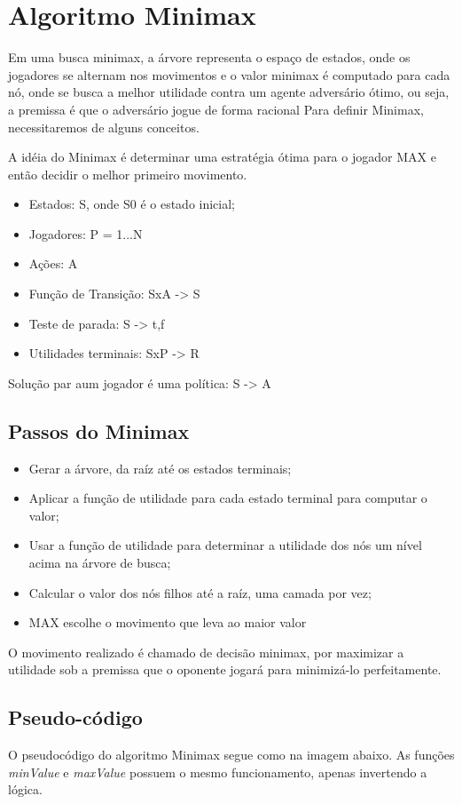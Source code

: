 \documentclass[sigplan,screen]{acmart}
\begin{document}
\section{Algoritmo Minimax}
Em uma busca minimax, a árvore representa o espaço de estados, onde os jogadores se alternam nos movimentos e o valor minimax é computado para cada nó, onde se busca a melhor utilidade contra um agente adversário ótimo, ou seja, a premissa é que o adversário jogue de forma racional
Para definir Minimax, necessitaremos de alguns conceitos.

A idéia do Minimax é determinar uma estratégia ótima para o jogador MAX e então decidir o melhor primeiro movimento.
\begin{itemize}
  \item{Estados: S, onde S0 é o estado inicial;}
  \item{Jogadores: P = {1...N}}
  \item{Ações: A}
  \item{Função de Transição: SxA -> S}
  \item{Teste de parada: S -> {t,f}}
  \item{Utilidades terminais: SxP -> R}
\end{itemize}

Solução par aum jogador é uma política: S -> A

\subsection{Passos do Minimax}

\begin{itemize}
  \item Gerar a árvore, da raíz até os estados terminais;
  \item Aplicar a função de utilidade para cada estado terminal para computar o valor;
  \item Usar a função de utilidade para determinar a utilidade dos nós um nível acima na árvore de busca;
  \item Calcular o valor dos nós filhos até a raíz, uma camada por vez;
  \item MAX escolhe o movimento que leva ao maior valor 
\end{itemize}

O movimento realizado é chamado de decisão minimax, por maximizar a utilidade sob a premissa que o oponente jogará para minimizá-lo perfeitamente.

\subsection{Pseudo-código}
O pseudocódigo do algoritmo Minimax segue como na imagem abaixo. 
As funções {\itshape minValue} e {\itshape maxValue} possuem o mesmo funcionamento, apenas invertendo a lógica.
\end{document}
